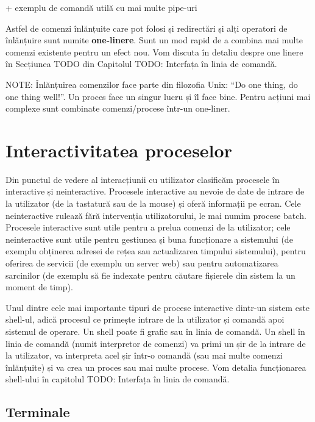 +     exemplu de comandă utilă cu mai multe pipe-uri

Astfel de comenzi înlănțuite care pot folosi și redirectări și alți operatori de
înlănțuire sunt numite \textbf{one-linere}. Sunt un mod rapid de a combina mai
multe comenzi existente pentru un efect nou. Vom discuta în detaliu despre one
linere în Secțiunea TODO din Capitolul TODO: Interfața în linia de comandă.

NOTE: Înlănțuirea comenzilor face parte din filozofia Unix: “Do one thing, do
one thing well!”. Un proces face un singur lucru și îl face bine. Pentru acțiuni
mai complexe sunt combinate comenzi/procese într-un one-liner.

\section{Interactivitatea proceselor}
\label{sec:procese-interactivitate}

Din punctul de vedere al interacțiunii cu utilizator clasificăm procesele în
interactive și neinteractive. Procesele interactive au nevoie de date de intrare
de la utilizator (de la tastatură sau de la mouse) și oferă informații pe ecran.
Cele neinteractive rulează fără intervenția utilizatorului, le mai numim procese
batch. Procesele interactive sunt utile pentru a prelua comenzi de la
utilizator; cele neinteractive sunt utile pentru gestiunea și buna funcționare a
sistemului (de exemplu obținerea adresei de rețea sau actualizarea timpului
sistemului), pentru oferirea de servicii (de exemplu un server web) sau pentru
automatizarea sarcinilor (de exemplu să fie indexate pentru căutare fișierele
din sistem la un moment de timp).

Unul dintre cele mai importante tipuri de procese interactive dintr-un sistem
este shell-ul, adică procesul ce primește intrare de la utilizator și comandă
apoi sistemul de operare. Un shell poate fi grafic sau în linia de comandă. Un
shell în linia de comandă (numit interpretor de comenzi) va primi un șir de la
intrare de la utilizator, va interpreta acel șir într-o comandă (sau mai multe
comenzi înlănțuite) și va crea un proces sau mai multe procese. Vom detalia
funcționarea shell-ului în capitolul TODO: Interfața în linia de comandă.

\subsection{Terminale}
\label{sec:procese-interactivitate-terminale}

